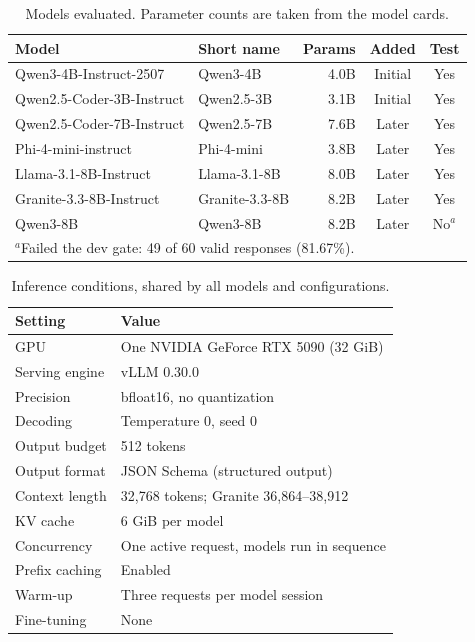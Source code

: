 \documentclass[a4paper,fleqn]{cas-dc}
\begin{document}
\begin{table}[t]
\centering\small
\caption{Models evaluated. Parameter counts are taken from the model cards.}
\label{tab:models}
\begin{tabular}{llrcc}
\toprule
Model & Short name & Params & Added & Test \\
\midrule
Qwen3-4B-Instruct-2507 \citep{yang2025qwen3} & Qwen3-4B & 4.0B & Initial & Yes \\
Qwen2.5-Coder-3B-Instruct \citep{hui2024qwen25coder} & Qwen2.5-3B & 3.1B & Initial & Yes \\
Qwen2.5-Coder-7B-Instruct \citep{hui2024qwen25coder} & Qwen2.5-7B & 7.6B & Later & Yes \\
Phi-4-mini-instruct \citep{microsoft2025phi4mini} & Phi-4-mini & 3.8B & Later & Yes \\
Llama-3.1-8B-Instruct \citep{grattafiori2024llama3} & Llama-3.1-8B & 8.0B & Later & Yes \\
Granite-3.3-8B-Instruct \citep{ibm2025granite33} & Granite-3.3-8B & 8.2B & Later & Yes \\
Qwen3-8B \citep{yang2025qwen3} & Qwen3-8B & 8.2B & Later & No$^{a}$ \\
\bottomrule
\multicolumn{5}{l}{\footnotesize $^{a}$Failed the dev gate: 49 of 60 valid responses (81.67\%).}
\end{tabular}
\end{table}

\begin{table}[t]
\centering\small
\caption{Inference conditions, shared by all models and configurations.}
\label{tab:inference}
\begin{tabular}{ll}
\toprule
Setting & Value \\
\midrule
GPU & One NVIDIA GeForce RTX 5090 (32 GiB) \\
Serving engine & vLLM 0.30.0 \citep{kwon2023vllm} \\
Precision & bfloat16, no quantization \\
Decoding & Temperature 0, seed 0 \\
Output budget & 512 tokens \\
Output format & JSON Schema (structured output) \\
Context length & 32,768 tokens; Granite 36,864--38,912 \\
KV cache & 6 GiB per model \\
Concurrency & One active request, models run in sequence \\
Prefix caching & Enabled \\
Warm-up & Three requests per model session \\
Fine-tuning & None \\
\bottomrule
\end{tabular}
\end{table}
\end{document}
